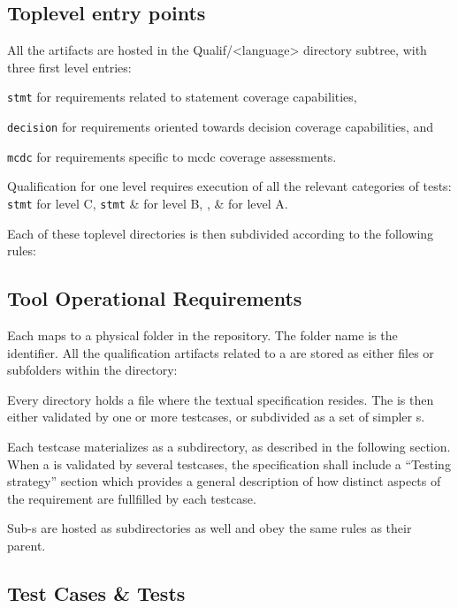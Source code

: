 \documentclass {report}
\begin{document}
\subsection{Toplevel entry points}

All the artifacts are hosted in the Qualif/<language> directory subtree, with
three first level entries:

\begin{Itemize}
\item \texttt{stmt} for requirements related to statement coverage
   capabilities,
%
\item \texttt{decision} for requirements oriented towards decision coverage
   capabilities, and
%
\item \texttt{mcdc} for requirements specific to mcdc coverage assessments.
\end{Itemize}

Qualification for one \do{} level requires execution of all the relevant
categories of tests: \texttt{stmt} for level C, \texttt{stmt} \& 
for level B, ,  \&  for level A.

Each of these toplevel directories is then subdivided according to
the following rules:

\subsection{Tool Operational Requirements}

Each \tor{} maps to a physical folder in the repository.
%
The folder name is the \tor{} identifier.
% 
All the qualification artifacts related to a \tor{} are stored as either files
or subfolders within the \tor{} directory:

Every \tor{} directory holds a  file where the \tor{} textual
specification resides.
%
The \tor{} is then either validated by one or more testcases, or subdivided
as a set of simpler \tor{}s.

Each testcase materializes as a subdirectory, as described in
the following section.
%
When a \tor{} is validated by several testcases, the  specification
shall include a ``Testing strategy'' section which provides a general
description of how distinct aspects of the requirement are fullfilled by each
testcase.

Sub-\tor{}s are hosted as subdirectories as well and obey the same rules as
their parent.

\subsection{Test Cases \& Tests}
\end{document}
